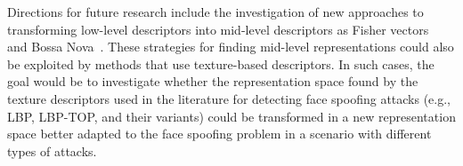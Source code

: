 Directions for future research include the investigation of new approaches to transforming low-level descriptors into mid-level descriptors as Fisher vectors~\cite{Perronnin:ECCV:2010} and Bossa Nova~\cite{Avila:ICIP:2011}. These strategies for finding mid-level representations could also be exploited by methods that use texture-based descriptors. In such cases, the goal would be to investigate whether the representation space found by the texture descriptors used in the literature for detecting face spoofing attacks (e.g., LBP, LBP-TOP, and their variants) could be transformed in a new representation space better adapted to the face spoofing problem in a scenario with different types of attacks.
